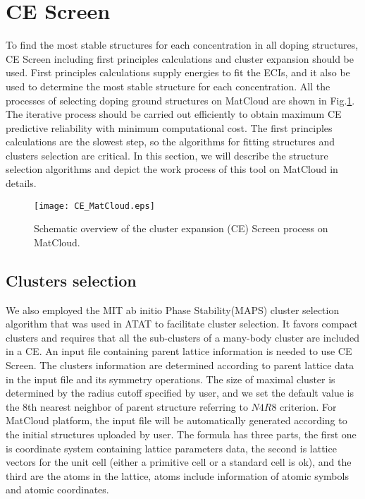 \documentclass[aps,preprint,amsmath,amssymb]{revtex4}
\begin{document}
\section{CE Screen}
To find the most stable structures for each concentration in all doping structures,
CE Screen including first principles calculations and cluster expansion should be used.
First principles calculations supply energies to fit the ECIs,
and it also be used to determine the most stable structure for each concentration.
All the processes of selecting doping ground structures on MatCloud are shown in Fig.\ref{process}.
The iterative process should be carried out efficiently to obtain maximum CE predictive reliability
with minimum computational cost. The first principles calculations are the slowest step,
so the algorithms for fitting structures and clusters selection are critical.
In this section, we will describe the structure selection algorithms and depict the work process of this tool on MatCloud in details.
\begin{figure}
  \centering
  \texttt{[image: CE\_MatCloud.eps]}
  \caption{Schematic overview of the cluster expansion (CE) Screen process on MatCloud.}\label{process}
\end{figure}
\subsection{Clusters selection}
We also employed the MIT ab initio Phase Stability(MAPS) cluster selection algorithm
that was used in ATAT\cite{VandeWalle2002} to facilitate cluster selection.
It favors compact clusters and requires that all the sub-clusters of
a many-body cluster are included in a CE\cite{Zarkevich2004,Herder2015}.
An input file containing parent lattice information is needed to use CE Screen.
The clusters information are determined according to parent lattice data in the input file and its symmetry operations.
The size of maximal cluster is determined by the radius cutoff specified by user, and we set the default
value is the 8th nearest neighbor of parent structure referring to $N4R8$ criterion\cite{Zhang2016}.
For MatCloud platform, the input file will be automatically generated according to the initial structures uploaded by user.
The formula has three parts,
the first one is coordinate system containing lattice parameters data, the second is lattice vectors for the
unit cell (either a primitive cell or a standard cell is ok),
and the third are the atoms in the lattice, atoms include information of atomic symbols and atomic coordinates.
\end{document}
